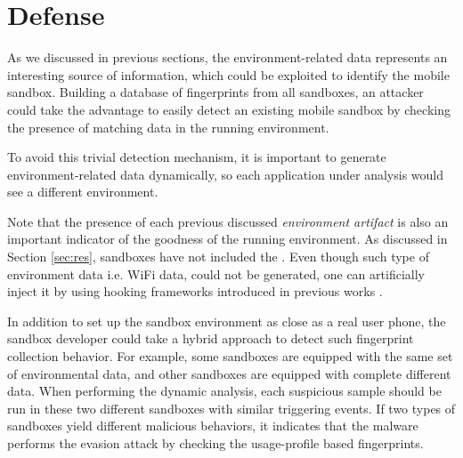 \section{Defense}
\label{sec:defense}
As we discussed in previous sections, the environment-related data represents an interesting source of information, which could be exploited to identify the mobile sandbox. Building a database of fingerprints from all sandboxes, an attacker could take the advantage to easily detect an existing mobile sandbox by checking the presence of matching data in the running environment.

To avoid this trivial detection mechanism, it is important to generate environment-related data dynamically, so each application under analysis would see a different environment.

Note that the presence of each previous discussed \textit{environment artifact} is also an important indicator of the goodness of the running environment. As discussed in Section \ref{sec:res}, sandboxes have not included the . Even though such type of environment data i.e. Wi\-Fi data, could not be generated, one can artificially inject it by using hooking frameworks introduced in previous works \cite{costamagna11artdroid, Xposed,Cydia,AndroidHooker}.

In addition to set up the sandbox environment as close as a real user phone, the sandbox developer could take a hybrid approach to detect such fingerprint collection behavior. For example, some sandboxes are equipped with the same set of environmental data, and other sandboxes are equipped with complete different data. When performing the dynamic analysis, each suspicious sample should be run in these two different sandboxes with similar triggering events. If two types of sandboxes yield different malicious behaviors, it indicates that the malware performs the evasion attack by checking the usage-profile based fingerprints.